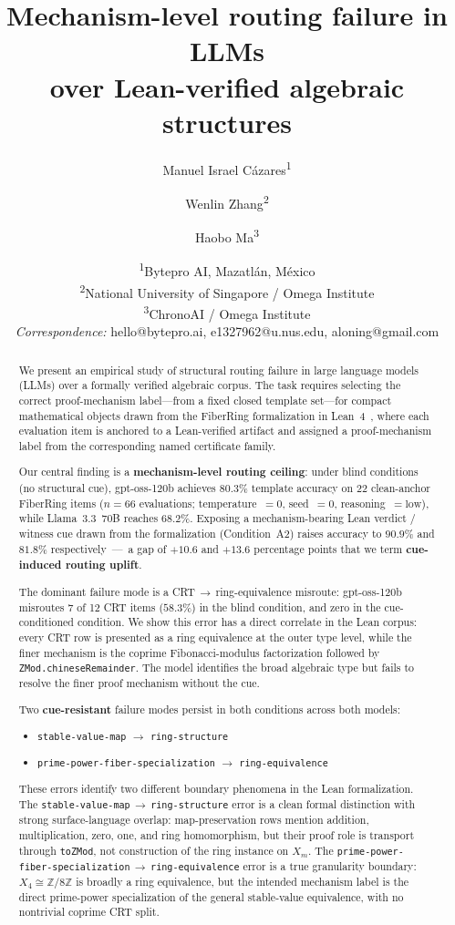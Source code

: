 \documentclass[11pt]{article}
\title{Mechanism-level routing failure in LLMs\\
       over Lean-verified algebraic structures}
\author{
  Manuel Israel C\'azares\textsuperscript{1} \and
  Wenlin Zhang\textsuperscript{2} \and
  Haobo Ma\textsuperscript{3}
}
\date{
  \textsuperscript{1}Bytepro AI, Mazatl\'an, M\'exico\\
  \textsuperscript{2}National University of Singapore / Omega Institute\\
  \textsuperscript{3}ChronoAI / Omega Institute\\[6pt]
  \small\textit{Correspondence:} hello@bytepro.ai, e1327962@u.nus.edu, aloning@gmail.com
}
\begin{document}
\maketitle

\begin{abstract}
We present an empirical study of structural routing failure in large language
models (LLMs) over a formally verified algebraic corpus. The task requires
selecting the correct proof-mechanism label---from a fixed closed
template set---for compact mathematical objects drawn from the FiberRing
formalization in Lean~4~\cite{omega2026automath}, where each evaluation item
is anchored to a Lean-verified artifact and assigned a proof-mechanism label
from the corresponding named certificate family.

Our central finding is a \textbf{mechanism-level routing ceiling}: under
blind conditions (no structural cue), gpt-oss-120b achieves $80.3\%$
template accuracy on 22 clean-anchor FiberRing items
($n=66$ evaluations; temperature~$=0$, seed~$=0$, reasoning~$=\mathrm{low}$),
while Llama~3.3~70B reaches $68.2\%$.
Exposing a mechanism-bearing Lean verdict / witness cue drawn from the
formalization (Condition~A2) raises accuracy to $90.9\%$ and $81.8\%$
respectively~---~a gap of $+10.6$ and $+13.6$ percentage points that we term
\textbf{cue-induced routing uplift}.

The dominant failure mode is a CRT\,$\to$\,ring-equivalence misroute:
gpt-oss-120b misroutes 7 of 12 CRT items ($58.3\%$) in the blind condition,
and zero in the cue-conditioned condition. We show this error has a direct
correlate in the Lean corpus: every CRT row is presented as a ring
equivalence at the outer type level, while the finer mechanism is the coprime
Fibonacci-modulus factorization followed by \texttt{ZMod.chineseRemainder}.
The model identifies the broad
algebraic type but fails to resolve the finer proof mechanism without the
cue.

Two \textbf{cue-resistant} failure modes persist in both conditions
across both models:
\begin{itemize}
  \item \texttt{stable{-}value{-}map} $\to$ \texttt{ring{-}structure}
  \item \texttt{prime{-}power{-}fiber{-}specialization} $\to$
        \texttt{ring{-}equivalence}
\end{itemize}
These errors identify two different boundary phenomena in the Lean
formalization. The \texttt{stable{-}value{-}map}$\,{\to}\,$\texttt{ring{-}structure}
error is a clean formal distinction with strong surface-language overlap:
map-preservation rows mention addition, multiplication, zero, one, and ring
homomorphism, but their proof role is transport through \texttt{toZMod}, not
construction of the ring instance on $X_m$. The
\texttt{prime{-}power{-}fiber{-}specialization}$\,{\to}\,$\texttt{ring{-}equivalence}
error is a true granularity boundary: $X_4 \cong \mathbb{Z}/8\mathbb{Z}$ is
broadly a ring equivalence, but the intended mechanism label is the direct
prime-power specialization of the general stable-value equivalence, with no
nontrivial coprime CRT split.


\end{abstract}
\end{document}
